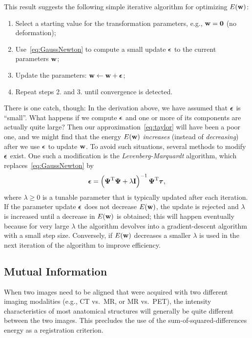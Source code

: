 \documentclass[10pt,twoside]{book}
\begin{document}
%
This result suggests the following simple iterative algorithm for optimizing $E(\mathbf{w})$:
\begin{enumerate}
 \item Select a starting value for the transformation parameters, e.g., $\mathbf{w}=\mathbf{0}$ (no deformation);
 \item Use~\eqref{eq:GaussNewton} to compute a small update ${\mbox{\boldmath {${\epsilon}$}}}$ to the current parameters $\mathbf{w}$;
 \item Update the parameters: $\mathbf{w} \gets \mathbf{w} + {\mbox{\boldmath {${\epsilon}$}}}$;
 \item Repeat steps 2. and 3. until convergence is detected.
\end{enumerate}
There is one catch, though:
In the derivation above, we have assumed that ${\mbox{\boldmath {${\epsilon}$}}}$ is ``small''. What happens if we compute ${\mbox{\boldmath {${\epsilon}$}}}$ and one or more of its components are actually quite large? Then our approximation~\eqref{eq:taylor} will have been a poor one, and we might find that the energy $E(\mathbf{w})$ \emph{increases} (instead of \emph{decreasing}) after we use ${\mbox{\boldmath {${\epsilon}$}}}$ to update $\mathbf{w}$. To avoid such situations, several methods to modify ${\mbox{\boldmath {${\epsilon}$}}}$ exist.
One such a modification is the \emph{Levenberg-Marquardt} algorithm, which replaces~\eqref{eq:GaussNewton} by
\begin{equation}
{\mbox{\boldmath {${\epsilon}$}}}
=
\left( 
{\mbox{\boldmath {${\Psi}$}}}^\mathrm{T} {\mbox{\boldmath {${\Psi}$}}}
+ \lambda \mathbf{I}
\right)^{-1}
{\mbox{\boldmath {${\Psi}$}}}^\mathrm{T}
{\mbox{\boldmath {${\tau}$}}}
\label{eq:Levenberg-Marquardt}
,
\end{equation}
where $\lambda \geq 0$ is a tunable parameter that is typically updated after each iteration. 
If the parameter update ${\mbox{\boldmath {${\epsilon}$}}}$ does not decrease $E(\mathbf{w})$, the update is rejected and $\lambda$ is increased until a decrease in $E(\mathbf{w})$ is obtained; this will happen eventually because for very large $\lambda$ the algorithm devolves into a gradient-descent algorithm with a small step size.
Conversely, if $E(\mathbf{w})$ decreases a smaller $\lambda$ is used in the next iteration of the algorithm to improve efficiency.


\clearpage
\subsection{Mutual Information}

When two images need to be aligned that were acquired with two different imaging modalities (e.g., CT vs.~MR, or MR vs.~PET), the intensity characteristics of most anatomical structures will generally be quite different between the two images. This precludes the use of the sum-of-squared-differences energy as a registration criterion.
\end{document}

